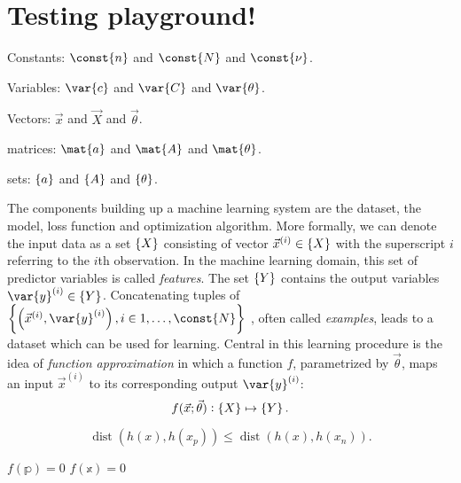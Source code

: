 \documentclass[\home/main.tex]{subfiles}
\begin{document}
\chapter{Testing playground!} \label{ch:fsds}

Constants: $\const{n}$ and $\const{N}$ and $\const{\nu}$.

Variables: $\var{c}$ and $\var{C}$ and $\var{\theta}$.

Vectors: $\vec{x}$ and $\vec{X}$ and $\vec{\theta}$.

matrices: $\mat{a}$ and $\mat{A}$ and $\mat{\theta}$.

sets: $\set{a}$ and $\set{A}$ and $\set{\theta}$.

The components building up a machine learning system are the dataset, the model, loss function and optimization algorithm.
More formally, we can denote the input data as a set $\set{X}$ consisting of vector $\vec{x}^{(i)} \in \set{X} $ with the superscript $i$ referring to the $i$th observation. In the machine learning domain, this set of predictor variables is called \textit{features}. The set $\set{Y}$ contains the output variables $\var{y}^{(i)} \in \set{Y}$. Concatenating tuples of
$\left\{\left(\vec{x}^{(i)}, \var{y}^{(i)}\right) , i \in 1,\dots,\const{N} \right\}$
, often called \textit{examples}, leads to a dataset which can be used for learning. Central in this learning procedure is the idea of \textit{function approximation} in which a function $f$, parametrized by $\vec{\theta}$, maps an input $\vec{x}^{(i)}$ to its corresponding output $\var{y}^{(i)}$:
\begin{equation*}
	f(\vec{x};\vec{\theta}): \set{X} \mapsto \set{Y}\text{.}
\end{equation*}



\begin{equation*}
	\operatorname{dist}{\left( h(x),h(x_p) \right)} \leq \operatorname{dist}{\left( h(x),h(x_n) \right)} .
\end{equation*}


$f(\mathbb{p}) = 0$
$f(\mathbb{x}) = 0$
\end{document}
